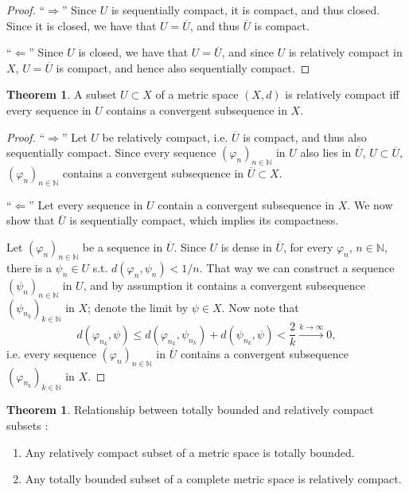 \documentclass[12pt, a4paper]{article}
\numberwithin{equation}{section}
\theoremstyle{definition}
\theoremstyle{definition}
\newtheorem{theorem}[thm]{Theorem}
\newcommand{\seq}[1][\varphi]{\left( #1 \right)_{n \in \mathbb{N}}}
\begin{document}
	\begin{proof}
		\enquote{$\Longrightarrow$} Since $U$ is sequentially compact, it is compact, and thus closed. Since it is closed, we have that $U = \overline{U}$, and thus $\overline{U}$ is compact.
		
		\enquote{$\Longleftarrow$} Since $U$ is closed, we have that $U = \overline{U}$, and since $U$ is relatively compact in $X$, $U = \overline{U}$ is compact, and hence also sequentially compact.
	\end{proof}

	\begin{theorem}
		A subset $U\subset X$ of a metric space $(X, d)$ is relatively compact iff every sequence in $U$ contains a convergent subsequence in $X$.
	\end{theorem}

	\begin{proof}
		\enquote{$\Longrightarrow$} Let $U$ be relatively compact, i.e. $\overline{U}$ is compact, and thus also sequentially compact. Since every sequence $\seq[\varphi_n]$ in $U$ also lies in $\overline{U}$, $U\subset \overline{U}$, $\seq[\varphi_n]$ contains a convergent subsequence in $\overline{U}\subset X$.
		
		\enquote{$\Longleftarrow$} Let every sequence in $U$ contain a convergent subsequence in $X$. We now show that $\overline{U}$ is sequentially compact, which implies its compactness.
		
		Let $\seq[\varphi_n]$ be a sequence in $\overline{U}$. Since $U$ is dense in $\overline{U}$, for every $\varphi_n$, $n\in\mathbb N$, there is a $\psi_n\in U$ s.t. $d(\varphi_n, \psi_n) < 1/n$. That way we can construct a sequence $\seq[\psi_n]$ in $U$, and by assumption it contains a convergent subsequence $\left(\psi_{n_k}\right)_{k\in\mathbb N}$ in $X$; denote the limit by $\psi\in X$. Now note that
		$$d(\varphi_{n_k}, \psi) \leq d(\varphi_{n_k}, \psi_{n_k}) + d(\psi_{n_k}, \psi) < \frac{2}{k} \overset{k\to\infty}{\longrightarrow} 0,$$ i.e. every sequence $\seq[\varphi_n]$ in $\overline{U}$ contains a convergent subsequence $\left(\varphi_{n_k}\right)_{k\in\mathbb N}$ in $X$.
	\end{proof}
	
	\begin{theorem}
		Relationship between totally bounded and relatively compact subsets \cite[Theorem 4.27]{src:relative_compactness}:
		\begin{enumerate}[label=(\alph*)]
			\item Any relatively compact subset of a metric space is totally bounded.
			\item Any totally bounded subset of a complete metric space is relatively compact.
		\end{enumerate}
	\end{theorem}
	
\end{document}
